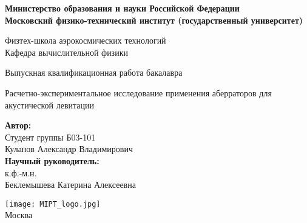 \begin{center}
    \large\textbf{Министерство образования и науки Российской Федерации \\
    Московский физико-технический институт (государственный
    университет)} \\
    \vspace{1cm}

    Физтех-школа аэрокосмических технологий \\

    Кафедра вычислительной физики \\

    \vspace{3em}

    Выпускная квалификационная работа бакалавра
\end{center}

\begin{center}
    \vspace{\fill}
    \LARGE{Расчетно-экспериментальное исследование применения аберраторов для акустической левитации}

    \vspace{\fill}
\end{center}


\begin{flushright}
    \textbf{Автор:} \\
    Студент группы Б03-101\\
    Куланов Александр Владимирович \\
    \vspace{2em}
    \textbf{Научный руководитель:} \\
    к.ф.-м.н.\\
    Беклемышева Катерина Алексеевна \\
    \vspace{2em}
\end{flushright}

\vspace{7em}

\begin{center}
    \texttt{[image: MIPT\_logo.jpg]}\\
    Москва \the\year{}
\end{center}

\thispagestyle{empty}

\newpage
\setcounter{page}{2}
\fancyfoot[c]{\thepage}
